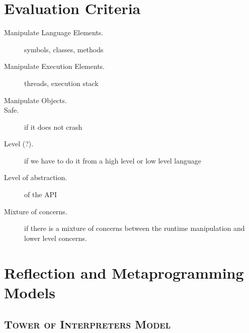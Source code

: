 
\section{Evaluation Criteria}\label{sec:runtime_modification_criteria}

\begin{description}

\item[Manipulate Language Elements.] symbols, classes, methods
\item[Manipulate Execution Elements.] threads, execution stack
\item[Manipulate Objects.]
\item[Safe.] if it does not crash
\item[Level (?).] if we have to do it from a high level or low level language
\item[Level of abstraction.] of the API
\item[Mixture of concerns.] if there is a mixture of concerns between the runtime manipulation and lower level concerns.

\end{description}

\section{Reflection and Metaprogramming Models}\label{sec:related_work_changing}

\subsection*{\textsc{Tower of Interpreters Model}}

